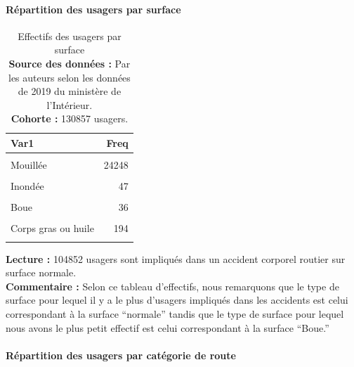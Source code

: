 \documentclass[french,]{tp}
\let\oldparagraph\paragraph
\renewcommand{\paragraph}[1]{\oldparagraph{#1}\mbox{}}
\begin{document}
\newpage

\hypertarget{ruxe9partition-des-usagers-par-surface}{%
\paragraph{Répartition des usagers par surface}\label{ruxe9partition-des-usagers-par-surface}}





\begin{table}[H]

\caption{\label{tab:tablesurf}Effectifs des usagers par surface\\
\textbf{Source des données :} Par les auteurs selon les données de 2019 du ministère de l'Intérieur.\\
\textbf{Cohorte :} 130857 usagers.\\}
\centering
\begin{tabular}[t]{lr}
\toprule
\textbf{Var1} & \textbf{Freq}\\
\midrule
\cellcolor{gray!6}{Normale} & \cellcolor{gray!6}{104852}\\
Mouillée & 24248\\
\cellcolor{gray!6}{Flaques} & \cellcolor{gray!6}{228}\\
Inondée & 47\\
\cellcolor{gray!6}{Enneigée} & \cellcolor{gray!6}{251}\\
\addlinespace
Boue & 36\\
\cellcolor{gray!6}{Verglacée} & \cellcolor{gray!6}{427}\\
Corps gras ou huile & 194\\
\cellcolor{gray!6}{Autre} & \cellcolor{gray!6}{574}\\
\bottomrule
\end{tabular}
\end{table}

\textbf{Lecture :} 104852 usagers sont impliqués dans un accident corporel routier sur surface normale.\\
\textbf{Commentaire :} Selon ce tableau d'effectifs, nous remarquons que le type de surface pour lequel il y a le plus d'usagers impliqués dans les accidents est celui correspondant à la surface ``normale'' tandis que le type de surface pour lequel nous avons le plus petit effectif est celui correspondant à la surface ``Boue.''

\newpage

\hypertarget{ruxe9partition-des-usagers-par-catuxe9gorie-de-route}{%
\paragraph{Répartition des usagers par catégorie de route}\label{ruxe9partition-des-usagers-par-catuxe9gorie-de-route}}
\end{document}
